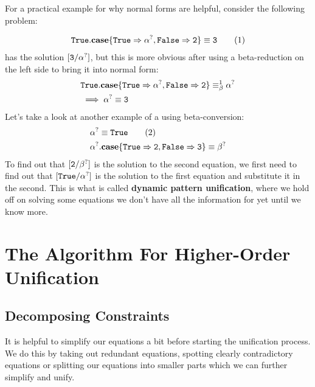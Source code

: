 \documentclass[twoside,12pt,a4paper]{article}
\begin{document}
For a practical example for why normal forms are helpful, consider the following problem:
\begin{example}
    \begin{align*}
        \mathtt{True}.\textbf{case}\{\mathtt{True} \Rightarrow \alpha^?, \mathtt{False} \Rightarrow \mathtt{2}\} \equiv \mathtt{3} \tag{1}
    \end{align*}
    has the solution $[\mathtt{3/\alpha^?}]$, but this is more obvious after using a beta-reduction on the left side 
    to bring it into normal form:
    \begin{align*}
        &\mathtt{True}.\textbf{case}\{\mathtt{True} \Rightarrow \alpha^?, \mathtt{False} \Rightarrow \mathtt{2}\} \equiv_{\beta}^1 \alpha^?\\
        &\implies \alpha^? \equiv \mathtt{3}   
    \end{align*}       
Let's take a look at another example of a using beta-conversion:
\begin{align*}
    &\alpha^? \equiv \mathtt{True} \tag{2}\\
    &\alpha^?.\textbf{case}\{\mathtt{True\Rightarrow 2, False\Rightarrow 3}\} \equiv \beta^?
\end{align*}
To find out that $[\mathtt{2}/\beta^?]$ is the solution to the second equation, we first need to find out that
$[\mathtt{True}/\alpha^?]$ is the solution to the first equation and substitute it in the second.
This is what is called \textbf{dynamic pattern unification}, where we hold off on solving some equations we don't have all the information for yet until we know more. 
 
\end{example}


\section{The Algorithm For Higher-Order Unification}

\subsection{Decomposing Constraints}

It is helpful to simplify our equations a bit before starting the unification process.
We do this by taking out redundant equations, spotting clearly contradictory equations or splitting our equations into smaller parts which we can further simplify and unify.
\end{document}
